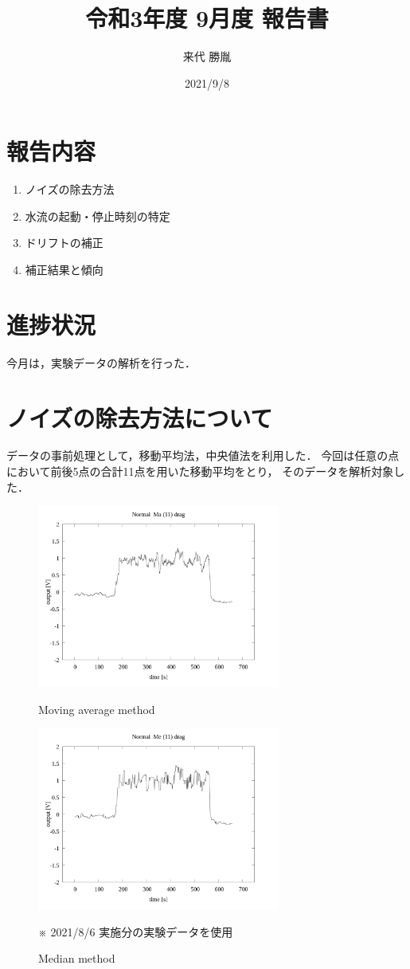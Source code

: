 \documentclass[twocolumn,a4j]{jsarticle}
\author{来代 勝胤}
\title{令和3年度 9月度 報告書}
\date{2021/9/8}
\begin{document}
\columnseprule=0.1mm

\maketitle
\section*{報告内容}
\begin{enumerate}[1.]
    \item ノイズの除去方法
    \item 水流の起動・停止時刻の特定
    \item ドリフトの補正
    \item 補正結果と傾向
\end{enumerate}
\section*{進捗状況}
今月は，実験データの解析を行った．
\section{ノイズの除去方法について}
データの事前処理として，移動平均法，中央値法を利用した．
今回は任意の点において前後5点の合計11点を用いた移動平均をとり，
そのデータを解析対象した．
\begin{figure}[htbp]
    \footnotesize
    \begin{center}
        \includegraphics[width=80mm]{images/Normal_ma(11)_drag_01.png}
        \caption{Moving average method}
        \includegraphics[width=80mm]{images/Normal_me(11)_drag_01.png}
        \caption{Median method}
        ※ 2021/8/6 実施分の実験データを使用
    \end{center}
\end{figure}
\end{document}
